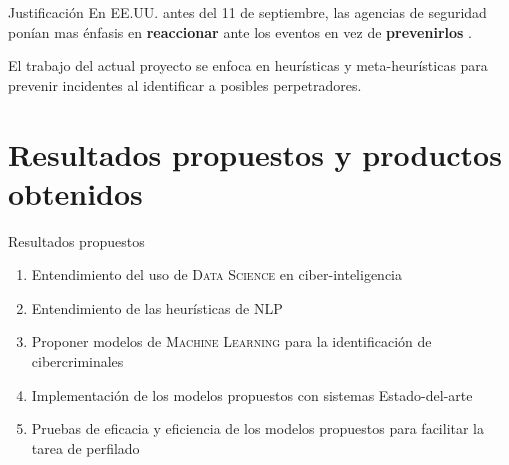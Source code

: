 \documentclass[10pt]{beamer}
\begin{document}
\begin{frame}{Justificación}
  En EE.UU. antes del 11 de septiembre, las agencias de seguridad ponían mas énfasis en \textbf{reaccionar} ante los eventos en vez de \textbf{prevenirlos} \cite{mena2003investigative}.

  El trabajo del actual proyecto se enfoca en heurísticas y meta-heurísticas para prevenir incidentes al identificar a posibles perpetradores.
\end{frame}

\section{Resultados propuestos y productos obtenidos}

\begin{frame}{Resultados propuestos}
  \begin{enumerate}
  \item Entendimiento del uso de \textsc{Data Science} en ciber-inteligencia
  \item Entendimiento de las heurísticas de \textsc{NLP}
  \item Proponer modelos de \textsc{Machine Learning} para la identificación de cibercriminales
  \item Implementación de los modelos propuestos con sistemas Estado-del-arte
  \item Pruebas de eficacia y eficiencia de los modelos propuestos para facilitar la tarea de perfilado
  \end{enumerate}
\end{frame}
\end{document}
